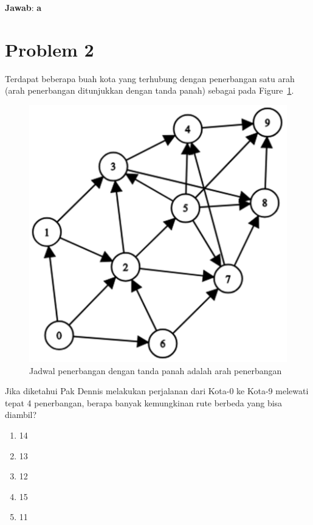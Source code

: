\documentclass{article}
\theoremstyle{plain}
\begin{document}
\bigskip
\noindent \textbf{Jawab}: \textbf{a}

\newpage
\section*{Problem 2}
Terdapat beberapa buah kota yang terhubung dengan penerbangan satu arah (arah penerbangan ditunjukkan dengan tanda panah) sebagai pada Figure~\ref{fig:jadwal-penerbangan}.

\begin{figure}[!ht]
\centering
\includegraphics[scale=.225]{images/problem-2-dan-3}
\caption{Jadwal penerbangan dengan tanda panah adalah arah penerbangan}
\label{fig:jadwal-penerbangan} 
\end{figure}

\noindent Jika diketahui Pak Dennis melakukan perjalanan dari Kota-0 ke Kota-9 melewati tepat 4 penerbangan, berapa banyak kemungkinan rute berbeda yang bisa diambil?
	\begin{enumerate}[-,topsep=0pt, nosep,label=\alph*. ]
		\item 14
		\item 13
		\item 12
		\item 15
		\item 11
	\end{enumerate}
\end{document}

